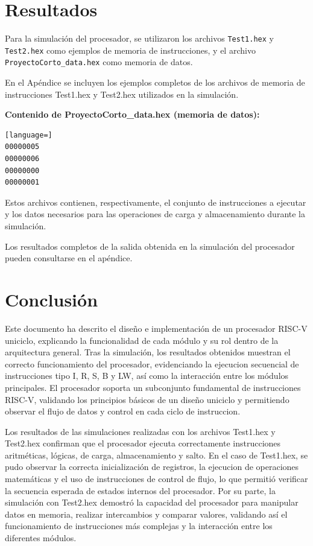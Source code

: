 \documentclass[conference]{IEEEtran}
\begin{document}
\section{Resultados}

Para la simulación del procesador, se utilizaron los archivos \texttt{Test1.hex} y \texttt{Test2.hex} como ejemplos de memoria de instrucciones, y el archivo \texttt{ProyectoCorto\_data.hex} como memoria de datos.

En el Apéndice se incluyen los ejemplos completos de los archivos de memoria de instrucciones Test1.hex y Test2.hex utilizados en la simulación.

\textbf{Contenido de ProyectoCorto\_data.hex (memoria de datos):}

\begin{lstlisting}[language=]
00000005
00000006
00000000
00000001
\end{lstlisting}

Estos archivos contienen, respectivamente, el conjunto de instrucciones a ejecutar y los datos necesarios para las operaciones de carga y almacenamiento durante la simulación.


Los resultados completos de la salida obtenida en la simulación del procesador pueden consultarse en el apéndice.

\section{Conclusión}
\label{sec:conclusion}
Este documento ha descrito el diseño e implementación de un procesador RISC-V uniciclo, explicando la funcionalidad de cada módulo y su rol dentro de la arquitectura general. Tras la simulación, los resultados obtenidos muestran el correcto funcionamiento del procesador, evidenciando la ejecucion secuencial de instrucciones tipo I, R, S, B y LW, así como la interacción entre los módulos principales. El procesador soporta un subconjunto fundamental de instrucciones RISC-V, validando los principios básicos de un diseño uniciclo y permitiendo observar el flujo de datos y control en cada ciclo de instruccion.

Los resultados de las simulaciones realizadas con los archivos Test1.hex y Test2.hex confirman que el procesador ejecuta correctamente instrucciones aritméticas, lógicas, de carga, almacenamiento y salto. En el caso de Test1.hex, se pudo observar la correcta inicialización de registros, la ejecucion de operaciones matemáticas y el uso de instrucciones de control de flujo, lo que permitió verificar la secuencia esperada de estados internos del procesador. Por su parte, la simulación con Test2.hex demostró la capacidad del procesador para manipular datos en memoria, realizar intercambios y comparar valores, validando así el funcionamiento de instrucciones más complejas y la interacción entre los diferentes módulos.
\end{document}
